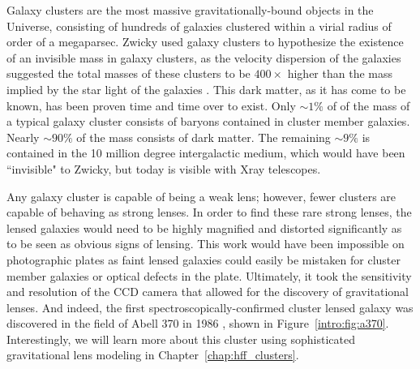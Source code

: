 Galaxy clusters are the most massive gravitationally-bound objects in the Universe, consisting of hundreds of galaxies clustered within a virial radius of order of a megaparsec. Zwicky used galaxy clusters to hypothesize the existence of an invisible mass in galaxy clusters, as the velocity dispersion of the galaxies suggested the total masses of these clusters to be $400\times$ higher than the mass implied by the star light of the galaxies \citep{Zwicky:1937yq}. This dark matter, as it has come to be known, has been proven time and time over to exist. Only $\sim1\%$ of of the mass of a typical galaxy cluster consists of baryons contained in cluster member galaxies. Nearly $\sim90\%$ of the mass consists of dark matter. The remaining $\sim9\%$ is contained in the 10 million degree intergalactic medium, which would have been ``invisible" to Zwicky, but today is visible with Xray telescopes.

Any galaxy cluster is capable of being a weak lens; however, fewer clusters are capable of behaving as strong lenses.  In order to find these rare strong lenses, the lensed galaxies would need to be highly magnified and distorted significantly as to be seen as obvious signs of lensing. This work would have been impossible on photographic plates as faint lensed galaxies could easily be mistaken for cluster member galaxies or optical defects in the plate. Ultimately, it took the sensitivity and resolution of the CCD camera that allowed for the discovery of gravitational lenses. And indeed, the first spectroscopically-confirmed cluster lensed galaxy was discovered in the field of Abell 370 in 1986 \citep{Soucail:1988kx,Soucail:1987sf,Soucail:1987rz}, shown in Figure~\ref{intro:fig:a370}. Interestingly, we will learn more about this cluster using sophisticated gravitational lens modeling in Chapter~\ref{chap:hff_clusters}.

